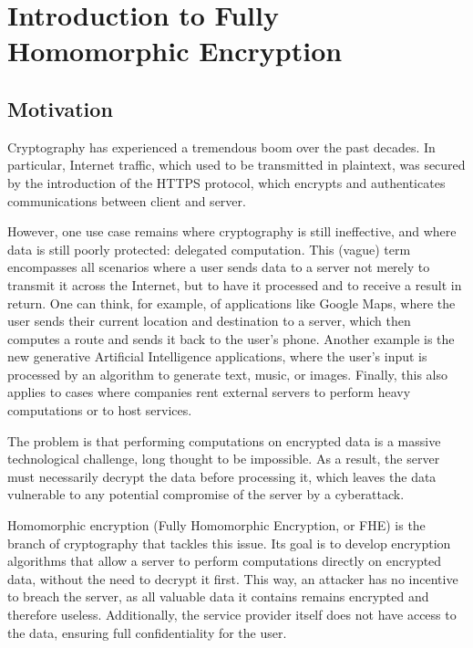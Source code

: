 
\chapter{Introduction to Fully Homomorphic Encryption}
\label{chap:fhe}


\section{Motivation}

Cryptography has experienced a tremendous boom over the past decades. In particular, Internet traffic, which used to be transmitted in plaintext, was secured by the introduction of the HTTPS protocol, which encrypts and authenticates communications between client and server.

However, one use case remains where cryptography is still ineffective, and where data is still poorly protected: delegated computation. This (vague) term encompasses all scenarios where a user sends data to a server not merely to transmit it across the Internet, but to have it processed and to receive a result in return. One can think, for example, of applications like Google Maps, where the user sends their current location and destination to a server, which then computes a route and sends it back to the user’s phone. Another example is the new generative Artificial Intelligence applications, where the user’s input is processed by an algorithm to generate text, music, or images. Finally, this also applies to cases where companies rent external servers to perform heavy computations or to host services.

The problem is that performing computations on encrypted data is a massive technological challenge, long thought to be impossible. As a result, the server must necessarily decrypt the data before processing it, which leaves the data vulnerable to any potential compromise of the server by a cyberattack.


Homomorphic encryption (Fully Homomorphic Encryption, or FHE) is the branch of cryptography that tackles this issue. Its goal is to develop encryption algorithms that allow a server to perform computations directly on encrypted data, without the need to decrypt it first. This way, an attacker has no incentive to breach the server, as all valuable data it contains remains encrypted and therefore useless. Additionally, the service provider itself does not have access to the data, ensuring full confidentiality for the user.




